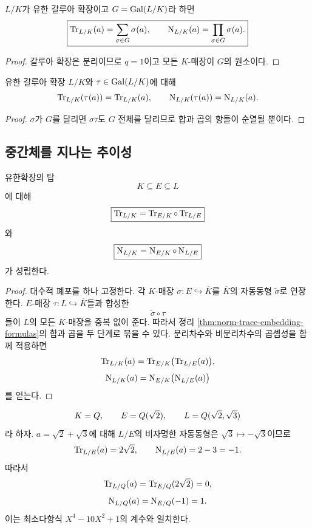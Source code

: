 \begin{corollary}
\label{cor:galois-norm-trace-formulas}
$L/K$가 유한 갈루아 확장이고 $G=\operatorname{Gal}(L/K)$라 하면
\[
  \boxed{
  \operatorname{Tr}_{L/K}(a)=\sum_{\sigma\in G}\sigma(a),
  \qquad
  \operatorname{N}_{L/K}(a)=\prod_{\sigma\in G}\sigma(a).}
\]
\end{corollary}

\begin{proof}
갈루아 확장은 분리이므로 $q=1$이고 모든 $K$-매장이 $G$의 원소이다.
\end{proof}

\begin{corollary}
\label{cor:norm-trace-galois-invariance}
유한 갈루아 확장 $L/K$와 $\tau\in\operatorname{Gal}(L/K)$에 대해
\[
  \operatorname{Tr}_{L/K}(\tau(a))=\operatorname{Tr}_{L/K}(a),
  \qquad
  \operatorname{N}_{L/K}(\tau(a))=\operatorname{N}_{L/K}(a).
\]
\end{corollary}

\begin{proof}
$\sigma$가 $G$를 달리면 $\sigma\tau$도 $G$ 전체를 달리므로
합과 곱의 항들이 순열될 뿐이다.
\end{proof}

\subsection{중간체를 지나는 추이성}

\begin{theorem}
\label{thm:norm-trace-transitivity}
유한확장의 탑
\[
  K\subseteq E\subseteq L
\]
에 대해
\[
  \boxed{
  \operatorname{Tr}_{L/K}
  =\operatorname{Tr}_{E/K}\circ\operatorname{Tr}_{L/E}}
\]
와
\[
  \boxed{
  \operatorname{N}_{L/K}
  =\operatorname{N}_{E/K}\circ\operatorname{N}_{L/E}}
\]
가 성립한다.
\end{theorem}

\begin{proof}
대수적 폐포를 하나 고정한다. 각 $K$-매장
$\sigma:E\hookrightarrow\overline K$를
$\overline K$의 자동동형 $\widetilde\sigma$로 연장한다.
$E$-매장 $\tau:L\hookrightarrow\overline K$들과 합성한
\[
  \widetilde\sigma\circ\tau
\]
들이 $L$의 모든 $K$-매장을 중복 없이 준다. 따라서 정리
\ref{thm:norm-trace-embedding-formulas}의 합과 곱을 두 단계로 묶을 수 있다.
분리차수와 비분리차수의 곱셈성을 함께 적용하면
\[
  \operatorname{Tr}_{L/K}(a)
  =\operatorname{Tr}_{E/K}\bigl(\operatorname{Tr}_{L/E}(a)\bigr),
\]
\[
  \operatorname{N}_{L/K}(a)
  =\operatorname{N}_{E/K}\bigl(\operatorname{N}_{L/E}(a)\bigr)
\]
를 얻는다.
\end{proof}

\begin{example}
\[
  K=Q,\qquad
  E=Q(\sqrt2),\qquad
  L=Q(\sqrt2,\sqrt3)
\]
라 하자. $a=\sqrt2+\sqrt3$에 대해 $L/E$의 비자명한 자동동형은
$\sqrt3\mapsto-\sqrt3$이므로
\[
  \operatorname{Tr}_{L/E}(a)=2\sqrt2,
  \qquad
  \operatorname{N}_{L/E}(a)=2-3=-1.
\]
따라서
\[
  \operatorname{Tr}_{L/Q}(a)
  =\operatorname{Tr}_{E/Q}(2\sqrt2)=0,
\]
\[
  \operatorname{N}_{L/Q}(a)
  =\operatorname{N}_{E/Q}(-1)=1.
\]
이는 최소다항식 $X^4-10X^2+1$의 계수와 일치한다.
\end{example}

